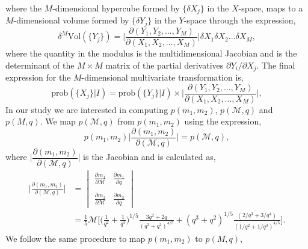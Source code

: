 \documentclass[a4paper,12pt]{article}
\begin{document}
where the $M$-dimensional hypercube formed by $\{\delta X_{j}\}$ in the $X$-space, maps to a $M$-dimensional volume formed by $\{\delta Y_{j}\}$ in the $Y$-space through the expression,
\begin{equation}
\delta^{M}\text{Vol}(\{Y_{j}\}) = \bigg| \frac{\partial(Y_{1},Y_{2},...,Y_{M})}{\partial(X_{1},X_{2},...,X_{M})} \bigg| \delta X_{1} \delta X_{2}...\delta X_{M},
\label{multijacobian2}
\end{equation}
where the quantity in the modulus is the multidimensional Jacobian and is the determinant of the $M \times M$ matrix of the partial derivatives $\partial Y_{i}/\partial X_{j} $. The final expression for the $M$-dimensional multivariate transformation is,
\begin{equation}
\text{prob}(\{X_{j}\}|I) = \text{prob}(\{Y_{j}\}|I) \times \bigg| \frac{\partial(Y_{1},Y_{2},...,Y_{M})}{\partial(X_{1},X_{2},...,X_{M})} \bigg|,
\label{multijacobian2}
\end{equation}
In our study we are interested in computing $p(m_1,m_2)$, $p(\mathcal{M},q)$ and $p(M,q)$. We map $p(\mathcal{M},q)$ from $p(m_1,m_2)$ using the expression,
\begin{equation}
p(m_1,m_2)\bigg|\frac{\partial(m_1,m_2)}{\partial(\mathcal{M},q)}\bigg|=p(\mathcal{M},q),
\label{eq:m1m2tochirpMq}
\end{equation}
where $\bigg| \dfrac{\partial(m_1,m_2)}{\partial(\mathcal{M},q)} \bigg|$ is the Jacobian and is calculated as,
\begin{equation}
\begin{split}
\bigg| \frac{\partial(m_1,m_2)}{\partial(\mathcal{M},q)} \bigg| &=
\begin{vmatrix} 
     \displaystyle
     \frac{\partial m_1}     
     {\partial\mathcal{M}} &
     \displaystyle
     \frac{\partial m_1}     
     {\partial q}
     \\ \\
     \displaystyle
     \frac{\partial m_2}     
     {\partial \mathcal{M}} & 
     \displaystyle
     \frac{\partial m_2}     
     {\partial q}   
\end{vmatrix} \\
&= \frac{1}{5} \mathcal{M}\bigg[ \bigg( \frac{1}{q^{2}}+\frac{1}{q^{3}} \bigg)^{1/5} \frac{3 q^{2} + 2 q}{(q^{3} + q^{2})^{4/5}} + (q^{3} + q^{2})^{1/5} \frac{(2/q^{3} + 3/q^{4})}{(1/q^{2} + 1/q^{3})^{4/5}}\bigg].
\label{eq:jacobianm1m2chirpMq}
\end{split}
\end{equation}
We follow the same procedure to map $p(m_1,m_2)$ to $p(M,q)$,
\end{document}
